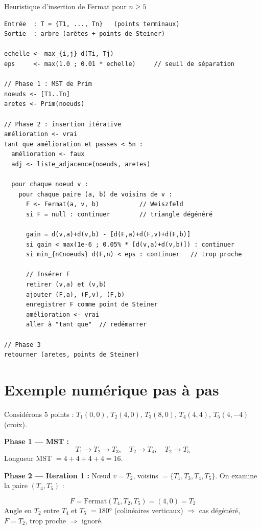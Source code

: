 \documentclass[12pt,a4paper]{article}
\begin{document}
\begin{algbox}{Heuristique d'insertion de Fermat pour $n \geq 5$}
\begin{lstlisting}[language={}]
Entrée  : T = {T1, ..., Tn}   (points terminaux)
Sortie  : arbre (arêtes + points de Steiner)

echelle <- max_{i,j} d(Ti, Tj)
eps     <- max(1.0 ; 0.01 * echelle)     // seuil de séparation

// Phase 1 : MST de Prim
noeuds <- [T1..Tn]
aretes <- Prim(noeuds)

// Phase 2 : insertion itérative
amélioration <- vrai
tant que amélioration et passes < 5n :
  amélioration <- faux
  adj <- liste_adjacence(noeuds, aretes)

  pour chaque noeud v :
    pour chaque paire (a, b) de voisins de v :
      F <- Fermat(a, v, b)           // Weiszfeld
      si F = null : continuer        // triangle dégénéré

      gain = d(v,a)+d(v,b) - [d(F,a)+d(F,v)+d(F,b)]
      si gain < max(1e-6 ; 0.05% * [d(v,a)+d(v,b)]) : continuer
      si min_{n∈noeuds} d(F,n) < eps : continuer   // trop proche

      // Insérer F
      retirer (v,a) et (v,b)
      ajouter (F,a), (F,v), (F,b)
      enregistrer F comme point de Steiner
      amélioration <- vrai
      aller à "tant que"  // redémarrer

// Phase 3
retourner (aretes, points de Steiner)
\end{lstlisting}
\end{algbox}

\section{Exemple numérique pas à pas}

Considérons 5 points : $T_1(0,0)$, $T_2(4,0)$, $T_3(8,0)$,
$T_4(4,4)$, $T_5(4,-4)$ (croix).

\textbf{Phase 1 — MST :}
\[
  T_1 \to T_2 \to T_3,\quad T_2 \to T_4,\quad T_2 \to T_5
\]
Longueur MST $= 4 + 4 + 4 + 4 = 16$.

\textbf{Phase 2 — Iteration 1 :}
Nœud $v = T_2$, voisins $= \{T_1, T_3, T_4, T_5\}$.
On examine la paire $(T_4, T_5)$ :

\[
  F = \text{Fermat}(T_4, T_2, T_5) = (4, 0) = T_2
\]
Angle en $T_2$ entre $T_4$ et $T_5$ $= 180°$ (colinéaires verticaux)
$\Rightarrow$ cas dégénéré, $F = T_2$, trop proche $\Rightarrow$ ignoré.
\end{document}
